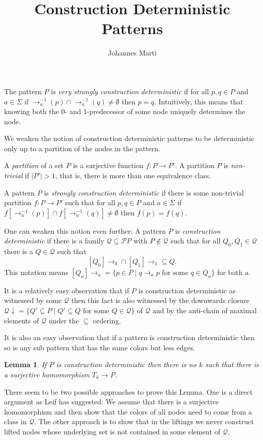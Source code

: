 \documentclass[a4paper]{article}
\title{Construction Deterministic Patterns}
\author{Johannes Marti}
\newcommand{\prearrow}[1]{{\rightarrow_{#1}^{-1}}}
\newcommand{\powerset}{\mathcal{P}}
\newcommand{\Q}{\mathcal{Q}}
\newtheorem{lemma}[theorem]{Lemma}
\begin{document}
\maketitle

\noindent The pattern $P$ is \emph{very strongly construction
deterministic} if for all $p,q \in P$ and $a \in \Sigma$ if
$\prearrow{a}(p) \cap \prearrow{a}(q) \neq \emptyset$ then $p = q$.
Intuitively, this means that knowing both the 0- and 1-predecessor of
some node uniquely determines the node.

We weaken the notion of construction deterministic patterns to be
deterministic only up to a partition of the nodes in the pattern.

A \emph{partition} of a set $P$ is a surjective function $f : P \to P'$.
A partition $P$ is \emph{non-trivial} if $|P'| > 1$, that is, there is
more than one equivalence class.

A pattern $P$ is \emph{strongly construction deterministic} if there is
some non-trivial partition $f : P \to P'$ such that for all $p,q \in P$
and $a \in \Sigma$ if $f[\prearrow{a}(p)] \cap f[\prearrow{a}(q)] \neq
\emptyset$ then $f(p) = f(q)$.

One can weaken this notion even further: A pattern $P$ is
\emph{construction deterministic} if there is a family $\Q \subseteq
\powerset P$ with $P \notin \Q$ such that for all $Q_0, Q_1 \in \Q$
there is a $Q \in \Q$ such that
\[
 [Q_0]{\rightarrow_0} \cap [Q_1]{\rightarrow_1} \subseteq Q.
\]
This notation means $[Q_a]{\rightarrow_a} = \{p \in P \mid q \rightarrow_a
p \mbox{ for some } q \in Q_a\}$ for both $a$.

It is a relatively easy observation that if $P$ is construction
deterministic as witnessed by some $\Q$ then this fact is also witnessed
by the downwards closure ${\Q\!\downarrow} = \{Q' \subseteq P \mid Q'
\subseteq Q \mbox{ for some } Q \in \Q\}$ of $\Q$ and by the anti-chain
of maximal elements of $\Q$ under the $\subseteq$ ordering.

It is also an easy observation that if a pattern is construction
deterministic then so is any sub pattern that has the same colors but
less edges.

\begin{lemma} \label{killer lemma}
 If $P$ is construction deterministic then there is no $k$ such
that there is a surjective homomorphism $T_k \to P$.
\end{lemma}
There seem to be two possible approaches to prove this Lemma. One is a
direct argument as Leif has suggested: We assume that there is a
surjective homomorphism and then show that the colors of all nodes need
to come from a class in $\Q$. The other approach is to show that in the
liftings we never construct lifted nodes whose underlying set is not
contained in some element of $\Q$.
\end{document}

